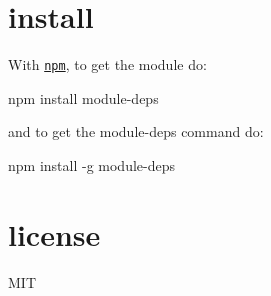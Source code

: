 \section*{install}

With \href{http://npmjs.org}{\tt npm}, to get the module do\+:


\begin{DoxyCode}
npm install module-deps
\end{DoxyCode}


and to get the {\ttfamily module-\/deps} command do\+:


\begin{DoxyCode}
npm install -g module-deps
\end{DoxyCode}


\section*{license}

M\+IT 